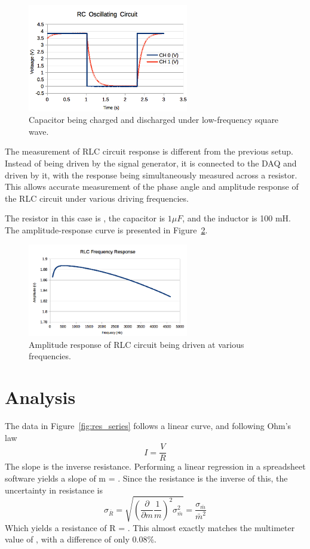 \documentclass[journal]{IEEEtran}
\begin{document}
\begin{figure}[ht!]
\centering
\includegraphics[width=70mm]{rc_response.png}
\caption{Capacitor being charged and discharged under low-frequency square wave.}
\label{fig:rc_response}
\end{figure}

The measurement of RLC circuit response is different from the previous setup.
Instead of being driven by the signal generator, it is connected to the DAQ and
driven by it, with the response being simultaneously measured across a
resistor. This allows accurate measurement of the phase angle and amplitude
response of the RLC circuit under various driving frequencies.

The resistor in this case is , the capacitor is $1
\mu F$, and the inductor is 100 mH. The amplitude-response curve is presented in
Figure~\ref{fig:rlc_response}.

\begin{figure}[ht!]
\centering
\includegraphics[width=70mm]{rlc_response.png}
\caption{Amplitude response of RLC circuit being driven at various frequencies.}
\label{fig:rlc_response}
\end{figure}

\section{Analysis}

The data in Figure~\ref{fig:res_series} follows a linear curve, and following Ohm's law
\begin{displaymath}
I = \frac{V}{R}
\end{displaymath} 
The slope is the inverse resistance. Performing a linear regression in a
spreadsheet software yields a slope of m = . Since the
resistance is the inverse of this, the uncertainty in resistance is 
\begin{displaymath}
\sigma _{\bar R} = \sqrt{\left( \frac{\partial}{\partial m} \frac{1}{m}
\right)^2 \sigma _{\bar m}^2} = \frac{\sigma _{\bar m}}{\bar m^2}
\end{displaymath} 
Which yields a resistance of R = . This almost exactly
matches the multimeter value of , with a difference of
only 0.08\%.
\end{document}
